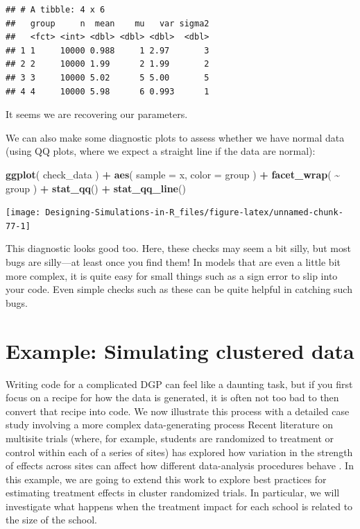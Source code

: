 \documentclass[
]{book}
\newenvironment{Shaded}{\begin{snugshade}}{\end{snugshade}}
\newcommand{\AttributeTok}[1]{\textcolor[rgb]{0.13,0.29,0.53}{#1}}
\newcommand{\FunctionTok}[1]{\textcolor[rgb]{0.13,0.29,0.53}{\textbf{#1}}}
\newcommand{\NormalTok}[1]{#1}
\newcommand{\SpecialCharTok}[1]{\textcolor[rgb]{0.81,0.36,0.00}{\textbf{#1}}}
\begin{document}
\begin{verbatim}
## # A tibble: 4 x 6
##   group     n  mean    mu   var sigma2
##   <fct> <int> <dbl> <dbl> <dbl>  <dbl>
## 1 1     10000 0.988     1 2.97       3
## 2 2     10000 1.99      2 1.99       2
## 3 3     10000 5.02      5 5.00       5
## 4 4     10000 5.98      6 0.993      1
\end{verbatim}

It seems we are recovering our parameters.

We can also make some diagnostic plots to assess whether we have normal data (using QQ plots, where we expect a straight line if the data are normal):

\begin{Shaded}
\begin{Highlighting}[]
\FunctionTok{ggplot}\NormalTok{( check\_data ) }\SpecialCharTok{+}
  \FunctionTok{aes}\NormalTok{( }\AttributeTok{sample =}\NormalTok{ x, }\AttributeTok{color =}\NormalTok{ group ) }\SpecialCharTok{+} 
  \FunctionTok{facet\_wrap}\NormalTok{( }\SpecialCharTok{\textasciitilde{}}\NormalTok{ group ) }\SpecialCharTok{+}
  \FunctionTok{stat\_qq}\NormalTok{() }\SpecialCharTok{+} \FunctionTok{stat\_qq\_line}\NormalTok{()}
\end{Highlighting}
\end{Shaded}

\begin{center}\texttt{[image: Designing-Simulations-in-R\_files/figure-latex/unnamed-chunk-77-1]} \end{center}

This diagnostic looks good too.
Here, these checks may seem a bit silly, but most bugs are silly---at least once you find them!
In models that are even a little bit more complex, it is quite easy for small things such as a sign error to slip into your code.
Even simple checks such as these can be quite helpful in catching such bugs.

\section{Example: Simulating clustered data}\label{case-cluster}

Writing code for a complicated DGP can feel like a daunting task, but if you first focus on a recipe for how the data is generated, it is often not too bad to then convert that recipe into code.
We now illustrate this process with a detailed case study involving a more complex data-generating process
Recent literature on multisite trials (where, for example, students are randomized to treatment or control within each of a series of sites) has explored how variation in the strength of effects across sites can affect how different data-analysis procedures behave \citep[e.g.,][]{miratrix2021applied, Bloom:2016um}.
In this example, we are going to extend this work to explore best practices for estimating treatment effects in cluster randomized trials.
In particular, we will investigate what happens when the treatment impact for each school is related to the size of the school.
\end{document}
